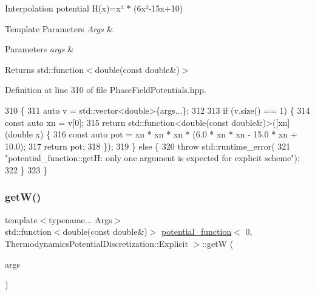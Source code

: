 Interpolation potential H(x)=x³ $\ast$ (6x²-\/15x+10) 


\begin{DoxyTemplParams}{Template Parameters}
{\em Args} & \\
\hline
\end{DoxyTemplParams}

\begin{DoxyParams}{Parameters}
{\em args} & \\
\hline
\end{DoxyParams}
\begin{DoxyReturn}{Returns}
std\+::function$<$double(const double\&)$>$ 
\end{DoxyReturn}


Definition at line 310 of file Phase\+Field\+Potentials.\+hpp.


\begin{DoxyCode}
310                                                         \{
311     \textcolor{keyword}{auto} v = std::vector<double>\{args...\};
312 
313     \textcolor{keywordflow}{if} (v.size() == 1) \{
314       \textcolor{keyword}{const} \textcolor{keyword}{auto} xn = v[0];
315       \textcolor{keywordflow}{return} std::function<double(const double&)>([xn](\textcolor{keywordtype}{double} x) \{
316         \textcolor{keyword}{const} \textcolor{keyword}{auto} pot = xn * xn * xn * (6.0 * xn * xn - 15.0 * xn + 10.0);
317         \textcolor{keywordflow}{return} pot;
318       \});
319     \} \textcolor{keywordflow}{else} \{
320       \textcolor{keywordflow}{throw} std::runtime\_error(
321           \textcolor{stringliteral}{"potential\_function::getH: only one argument is expected for explicit scheme"});
322     \}
323   \}
\end{DoxyCode}
\mbox{\label{structpotential__function_3_010_00_01ThermodynamicsPotentialDiscretization_1_1Explicit_01_4_aad1f4c29167d929c6da7b701539a40b0}} 
\subsubsection{\texorpdfstring{get\+W()}{getW()}}
{\footnotesize\ttfamily template$<$typename... Args$>$ \\
std\+::function$<$double(const double\&)$>$ \hyperlink{structpotential__function}{potential\+\_\+function}$<$ 0, Thermodynamics\+Potential\+Discretization\+::\+Explicit $>$\+::getW (\begin{DoxyParamCaption}\item[{Args...}]{args }\end{DoxyParamCaption})\hspace{0.3cm}{\ttfamily [inline]}}



